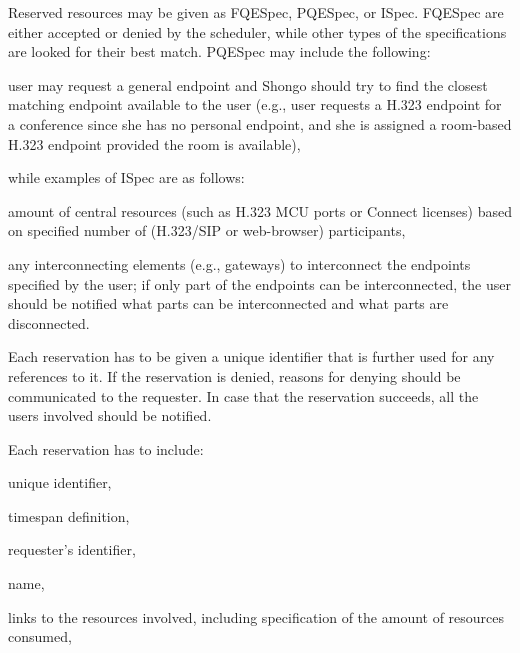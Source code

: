 \documentclass[a4paper]{report}
\makeatletter
\newcounter{UCcounter}
\newenvironment{UseCases}%
	{\begin{list}{\textbf{UC-\arabic{UCcounter}}}{\@nmbrlisttrue\def\@listctr{UCcounter}}}%
	{\end{list}}
\makeatother
\begin{document}
\begin{UseCases}
Reserved resources may be given as FQESpec, PQESpec, or ISpec. FQESpec are
either accepted or denied by the scheduler, while other types of the
specifications are looked for their best match. PQESpec may include the
following:

\begin{compactitem}

\item user may request a general endpoint and Shongo should try to find the
closest matching endpoint available to the user (e.g., user requests a H.323
endpoint for a conference since she has no personal endpoint, and she is
assigned a room-based H.323 endpoint provided the room is available),

\end{compactitem}

while examples of ISpec are as follows:

\begin{compactitem}

\item amount of central resources (such as H.323 MCU ports or Connect licenses)
based on specified number of (H.323/SIP or web-browser) participants,

\item any interconnecting elements (e.g., gateways) to interconnect the
endpoints specified by the user; if only part of the endpoints can be
interconnected, the user should be notified what parts can be interconnected
and what parts are disconnected.

\end{compactitem}

Each reservation has to be given a unique identifier that is further used for
any references to it. If the reservation is denied, reasons for denying should
be communicated to the requester. In case that the reservation succeeds, all
the users involved should be notified.


Each reservation has to include:

\begin{compactitem}

\item unique identifier,

\item timespan definition,

\item requester's identifier,

\item name,

\item links to the resources involved, including specification of the amount of resources consumed,


\end{compactitem}
\end{UseCases}
\end{document}
